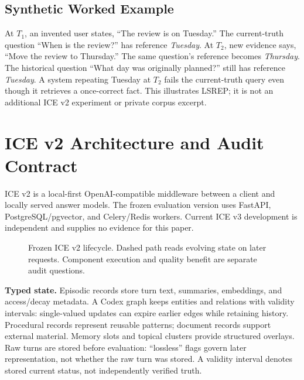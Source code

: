 \documentclass[11pt]{article}
\begin{document}
\subsection{Synthetic Worked Example}
At $T_1$, an invented user states, ``The review is on Tuesday.'' The current-truth question ``When is the review?'' has reference \emph{Tuesday}. At $T_2$, new evidence says, ``Move the review to Thursday.'' The same question's reference becomes \emph{Thursday}. The historical question ``What day was originally planned?'' still has reference \emph{Tuesday}. A system repeating Tuesday at $T_2$ fails the current-truth query even though it retrieves a once-correct fact. This illustrates LSREP; it is not an additional ICE v2 experiment or private corpus excerpt.

\section{ICE v2 Architecture and Audit Contract}
\label{sec:architecture}
ICE v2 is a local-first OpenAI-compatible middleware between a client and locally served answer models. The frozen evaluation version uses FastAPI, PostgreSQL/pgvector, and Celery/Redis workers. Current ICE v3 development is independent and supplies no evidence for this paper.

\begin{figure}[t]
\centering
{}
\caption{Frozen ICE v2 lifecycle. Dashed path reads evolving state on later requests. Component execution and quality benefit are separate audit questions.}
\label{fig:architecture}
\end{figure}

\textbf{Typed state.} Episodic records store turn text, summaries, embeddings, and access/decay metadata. A Codex graph keeps entities and relations with validity intervals: single-valued updates can expire earlier edges while retaining history. Procedural records represent reusable patterns; document records support external material. Memory slots and topical clusters provide structured overlays. Raw turns are stored before evaluation: ``lossless'' flags govern later representation, not whether the raw turn was stored. A validity interval denotes stored current status, not independently verified truth.
\end{document}
